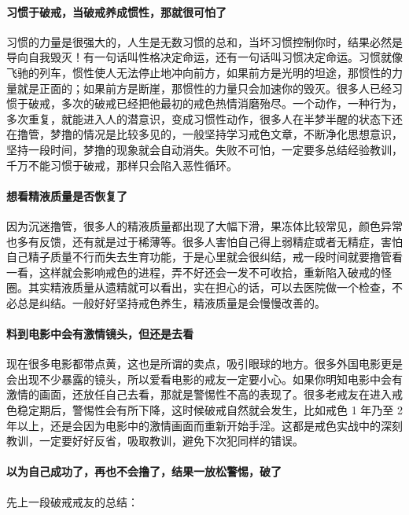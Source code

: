 \paragraph{习惯于破戒，当破戒养成惯性，那就很可怕了}

习惯的力量是很强大的，人生是无数习惯的总和，当坏习惯控制你时，结果必然是导向自我毁灭！有一句话叫性格决定命运，还有一句话叫习惯决定命运。习惯就像飞驰的列车，惯性使人无法停止地冲向前方，如果前方是光明的坦途，那惯性的力量就是正面的；如果前方是断崖，那惯性的力量只会加速你的毁灭。很多人已经习惯于破戒，多次的破戒已经把他最初的戒色热情消磨殆尽。一个动作，一种行为，多次重复，就能进入人的潜意识，变成习惯性动作，很多人在半梦半醒的状态下还在撸管，梦撸的情况是比较多见的，一般坚持学习戒色文章，不断净化思想意识，坚持一段时间，梦撸的现象就会自动消失。失败不可怕，一定要多总结经验教训，千万不能习惯于破戒，那样只会陷入恶性循环。

\paragraph{想看精液质量是否恢复了}

因为沉迷撸管，很多人的精液质量都出现了大幅下滑，果冻体比较常见，颜色异常也多有反馈，还有就是过于稀薄等。很多人害怕自己得上弱精症或者无精症，害怕自己精子质量不行而失去生育功能，于是心里就会很纠结，戒一段时间就要撸管看一看，这样就会影响戒色的进程，弄不好还会一发不可收拾，重新陷入破戒的怪圈。其实精液质量从遗精就可以看出，实在担心的话，可以去医院做一个检查，不必总是纠结。一般好好坚持戒色养生，精液质量是会慢慢改善的。

\paragraph{料到电影中会有激情镜头，但还是去看}

现在很多电影都带点黄，这也是所谓的卖点，吸引眼球的地方。很多外国电影更是会出现不少暴露的镜头，所以爱看电影的戒友一定要小心。如果你明知电影中会有激情的画面，还放任自己去看，那就是警惕性不高的表现了。很多老戒友在进入戒色稳定期后，警惕性会有所下降，这时候破戒自然就会发生，比如戒色 1 年乃至 2 年以上，还是会因为电影中的激情画面而重新开始手淫。这都是戒色实战中的深刻教训，一定要好好反省，吸取教训，避免下次犯同样的错误。

\paragraph{以为自己成功了，再也不会撸了，结果一放松警惕，破了}

先上一段破戒戒友的总结：

